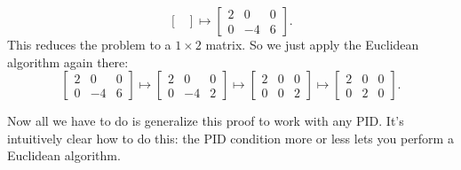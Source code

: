 \begin{example}
\[\begin{bmatrix}
		\end{bmatrix}
		\mapsto
		\begin{bmatrix} 
			2 & 0 & 0 \\
			0 & -4 & 6
		\end{bmatrix}.
	\]
	This reduces the problem to a $1 \times 2$ matrix.
	So we just apply the Euclidean algorithm again there:
	\[
		\begin{bmatrix} 
			2 & 0 & 0 \\
			0 & -4 & 6
		\end{bmatrix}
		\mapsto
		\begin{bmatrix} 
			2 & 0 & 0 \\
			0 & -4 & 2
		\end{bmatrix}
		\mapsto
		\begin{bmatrix} 
			2 & 0 & 0 \\
			0 & 0 & 2
		\end{bmatrix}
		\mapsto
		\begin{bmatrix} 
			2 & 0 & 0 \\
			0 & 2 & 0
		\end{bmatrix}.
	\]
\end{example}

Now all we have to do is generalize this proof to work
with any PID. It's intuitively clear how to do this:
the PID condition more or less lets you perform a Euclidean algorithm.

